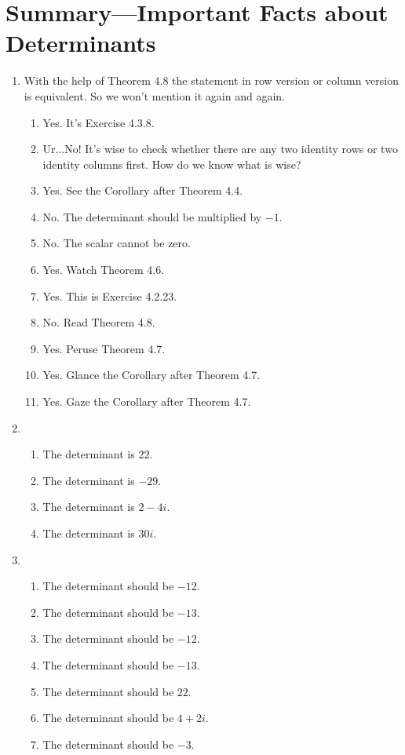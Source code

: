 \section{Summary---Important Facts about Determinants}
\begin{enumerate}
\item With the help of Theorem 4.8 the statement in row version or column version is equivalent. So we won't mention it again and again.\begin{enumerate}
\item Yes. It's Exercise 4.3.8.
\item Ur...No! It's wise to check whether there are any two identity rows or two identity columns first. How do we know what is wise?
\item Yes. See the Corollary after Theorem 4.4.
\item No. The determinant should be multiplied by $-1$.
\item No. The scalar cannot be zero.
\item Yes. Watch Theorem 4.6.
\item Yes. This is Exercise 4.2.23.
\item No. Read Theorem 4.8.
\item Yes. Peruse Theorem 4.7.
\item Yes. Glance the Corollary after Theorem 4.7.
\item Yes. Gaze the Corollary after Theorem 4.7.
\end{enumerate}
\item \begin{enumerate}
\item The determinant is $22$.
\item The determinant is $-29$.
\item The determinant is $2-4i$.
\item The determinant is $30i$.
\end{enumerate}
\item \begin{enumerate}
\item The determinant should be $-12$.
\item The determinant should be $-13$.
\item The determinant should be $-12$.
\item The determinant should be $-13$.
\item The determinant should be $22$.
\item The determinant should be $4+2i$.
\item The determinant should be $-3$.

\end{enumerate}
\end{enumerate}

